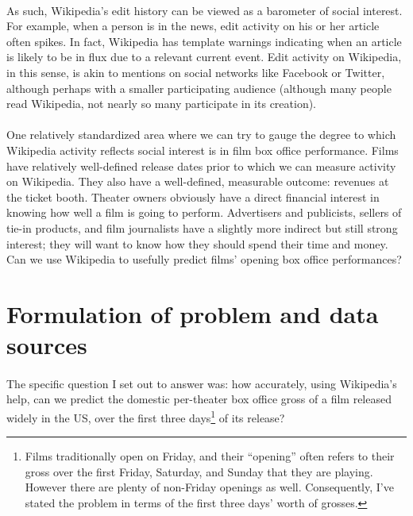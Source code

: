 \documentclass[10pt]{article}
\begin{document}
    \paragraph{}
    As such, Wikipedia's edit history can be viewed as a barometer of social interest. For example, when a person is in the news, edit activity on his or her article often spikes. In fact, Wikipedia has template warnings indicating when an article is likely to be in flux due to a relevant current event. Edit activity on Wikipedia, in this sense, is akin to mentions on social networks like Facebook or Twitter, although perhaps with a smaller participating audience (although many people read Wikipedia, not nearly so many participate in its creation). 
    
    \paragraph{}
    One relatively standardized area where we can try to gauge the degree to which Wikipedia activity reflects social interest is in film box office performance. Films have relatively well-defined release dates prior to which we can measure activity on Wikipedia. They also have a well-defined, measurable outcome: revenues at the ticket booth. Theater owners obviously have a direct financial interest in knowing how well a film is going to perform. Advertisers and publicists, sellers of tie-in products, and film journalists have a slightly more indirect but still strong interest; they will want to know how they should spend their time and money. Can we use Wikipedia to usefully predict films' opening box office performances? 
    
    \section{Formulation of problem and data sources}
    
    \paragraph{}
    The specific question I set out to answer was: how accurately, using Wikipedia's help, can we predict the domestic per-theater box office gross of a film released widely in the US, over the first three days\footnote{Films traditionally open on Friday, and their ``opening'' often refers to their gross over the first Friday, Saturday, and Sunday that they are playing. However there are plenty of non-Friday openings as well. Consequently, I've stated the problem in terms of the first three days' worth of grosses.} of its release? 
    
\end{document}
